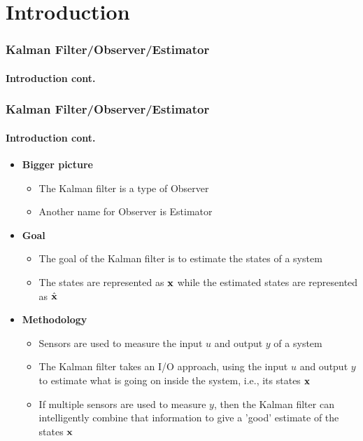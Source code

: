 \section{Introduction}


\begin{frame}\pw\Large
\frametitle{Kalman Filter/Observer/Estimator}
\framesubtitle{Introduction \tiny cont.}
\end{frame}


\begin{frame}\pw\Large
\frametitle{Kalman Filter/Observer/Estimator}
\framesubtitle{Introduction \tiny cont.}
\begin{itemize}
\item \textbf{Bigger picture}
\begin{itemize}\scriptsize
\item The Kalman filter is a type of {\color{blue}Observer}
\item Another name for Observer is Estimator
\end{itemize}
\item \textbf{Goal}
\begin{itemize}\scriptsize
\item The goal of the Kalman filter is to estimate the states of a system
\item The states are represented as $\textbf{x}$ while the estimated states are represented as $\hat{\textbf{x}}$
\end{itemize}
\item \textbf{Methodology}
\begin{itemize}\scriptsize
\item Sensors are used to measure the input $u$ and output $y$ of a system
\item The Kalman filter takes an I/O approach, using the input $u$ and output $y$ to estimate what is going on inside the system, i.e., its states $\textbf{x}$
\item If multiple sensors are used to measure $y$, then the Kalman filter can intelligently combine that information to give a 'good' estimate of the states $\textbf{x}$
\end{itemize}
\end{itemize}
\end{frame}




%


